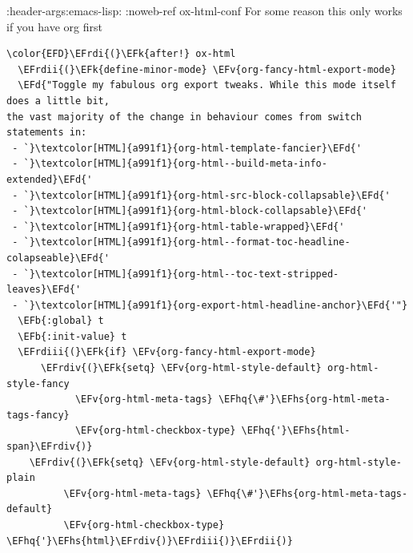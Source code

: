 \documentclass{scrartcl}
\newcommand{\EFk}[1]{\textcolor{EFk}{#1}} %
\newcommand{\EFd}[1]{\textcolor{EFd}{#1}} %
\newcommand{\EFb}[1]{\textcolor{EFb}{#1}} %
\newcommand{\EFv}[1]{\textcolor{EFv}{#1}} %
\newcommand{\EFhq}[1]{#1} %
\newcommand{\EFhs}[1]{#1} %
\newcommand{\EFrdi}[1]{#1} %
\newcommand{\EFrdii}[1]{#1} %
\newcommand{\EFrdiii}[1]{#1} %
\newcommand{\EFrdiv}[1]{#1} %
\begin{document}
:header-args:emacs-lisp: :noweb-ref ox-html-conf
For some reason this only works if you have org first
\begin{Code}
\begin{Verbatim}[]
\color{EFD}\EFrdi{(}\EFk{after!} ox-html
  \EFrdii{(}\EFk{define-minor-mode} \EFv{org-fancy-html-export-mode}
  \EFd{"Toggle my fabulous org export tweaks. While this mode itself does a little bit,
the vast majority of the change in behaviour comes from switch statements in:
 - `}\textcolor[HTML]{a991f1}{org-html-template-fancier}\EFd{'
 - `}\textcolor[HTML]{a991f1}{org-html--build-meta-info-extended}\EFd{'
 - `}\textcolor[HTML]{a991f1}{org-html-src-block-collapsable}\EFd{'
 - `}\textcolor[HTML]{a991f1}{org-html-block-collapsable}\EFd{'
 - `}\textcolor[HTML]{a991f1}{org-html-table-wrapped}\EFd{'
 - `}\textcolor[HTML]{a991f1}{org-html--format-toc-headline-colapseable}\EFd{'
 - `}\textcolor[HTML]{a991f1}{org-html--toc-text-stripped-leaves}\EFd{'
 - `}\textcolor[HTML]{a991f1}{org-export-html-headline-anchor}\EFd{'"}
  \EFb{:global} t
  \EFb{:init-value} t
  \EFrdiii{(}\EFk{if} \EFv{org-fancy-html-export-mode}
      \EFrdiv{(}\EFk{setq} \EFv{org-html-style-default} org-html-style-fancy
            \EFv{org-html-meta-tags} \EFhq{\#'}\EFhs{org-html-meta-tags-fancy}
            \EFv{org-html-checkbox-type} \EFhq{'}\EFhs{html-span}\EFrdiv{)}
    \EFrdiv{(}\EFk{setq} \EFv{org-html-style-default} org-html-style-plain
          \EFv{org-html-meta-tags} \EFhq{\#'}\EFhs{org-html-meta-tags-default}
          \EFv{org-html-checkbox-type} \EFhq{'}\EFhs{html}\EFrdiv{)}\EFrdiii{)}\EFrdii{)}


\end{Verbatim}
\end{Code}
\end{document}
